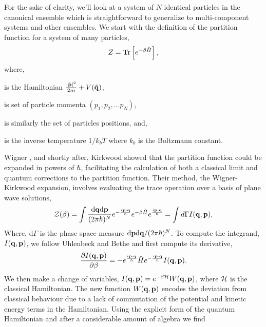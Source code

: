 For the sake of clarity, we'll look at a system of $N$ identical particles in
the canonical ensemble which is straightforward to generalize to
multi-component systems and other ensembles.  We start with the definition of
the partition function for a system of many particles,  
%
\begin{equation}
    \label{eq:quantum_partition}
    Z = \mathrm{Tr}\left[ e^{-\beta\hat{H}} \right], 
\end{equation} 
%
where, 
%
\begin{description}[align=right, labelwidth=1cm]
    \item[$\hat{H}$]{ is the Hamiltonian $\frac{\vert\hat{\mathbf{p}}\vert^2}{2m} +
        V(\hat{\mathbf{q}})$, 
    }
    \item[$\p$] is set of particle momenta $(p_1, p_2, ...p_N)$,
    \item[$\q$] is similarly the set of particles positions, and,
    \item[$\beta$]{ is the inverse temperature $1 / k_b T$ where $k_b$ is the
        Boltzmann constant.
    }  
\end{description}
%
Wigner \cite{PhysRev.40.749}, and shortly after, Kirkwood \cite{PhysRev.44.31}
showed that the partition function could be expanded in powers of $\hbar$,
facilitating the calculation of both a classical limit and quantum corrections
to the partition function.  Their method, the Wigner-Kirkwood expansion,
involves evaluating the trace operation over a basis of plane wave solutions,
%
\begin{equation}
    \mathcal{Z}(\beta) = \int \frac{\mathrm{d}\mathbf{q} \mathrm{d}\mathbf{p}}{(2\pi \hbar)^N}
        e^{-\frac{i\mathbf{p}\cdot\mathbf{q}}{\hbar}} 
        e^{-\beta \hat{H}} e^{\frac{i\mathbf{p}\cdot\mathbf{q}}{\hbar}} 
        = \int d\Gamma I(\mathbf{q}, \mathbf{p}), 
\end{equation}
%
Where, $\mathrm{d}\Gamma$ is the phase space measure
$\mathrm{d}\mathbf{p}\mathrm{d}\mathbf{q}/(2\pi\hbar)^N$.  To compute the integrand, $I(\mathbf{q}, \mathbf{p})$,
we follow Uhlenbeck and Bethe \cite{Uhlenbeck1936729} and first compute its
derivative,
%
\begin{equation}
    \frac{\partial I(\mathbf{q}, \mathbf{p})}{\partial \beta} = -e^{\frac{i\mathbf{p}\cdot\mathbf{q}}{\hbar}}\hat{H}e^{-\frac{i\mathbf{p}\cdot\mathbf{q}}{\hbar}} I(\mathbf{q}, \mathbf{p}).
\end{equation}
%
We then make a change of variables, $I(\mathbf{q}, \mathbf{p}) = e^{-\beta\mathcal{H}}W(\mathbf{q}, \mathbf{p})$,
where $\mathcal{H}$ is the classical Hamiltonian. The new function $W(\mathbf{q}, \mathbf{p})$ encodes
the deviation from classical behaviour due to a lack of commutation of the
potential and kinetic energy terms in the Hamiltonian. Using the explicit form
of the quantum Hamiltonian and after a considerable amount of algebra we find

